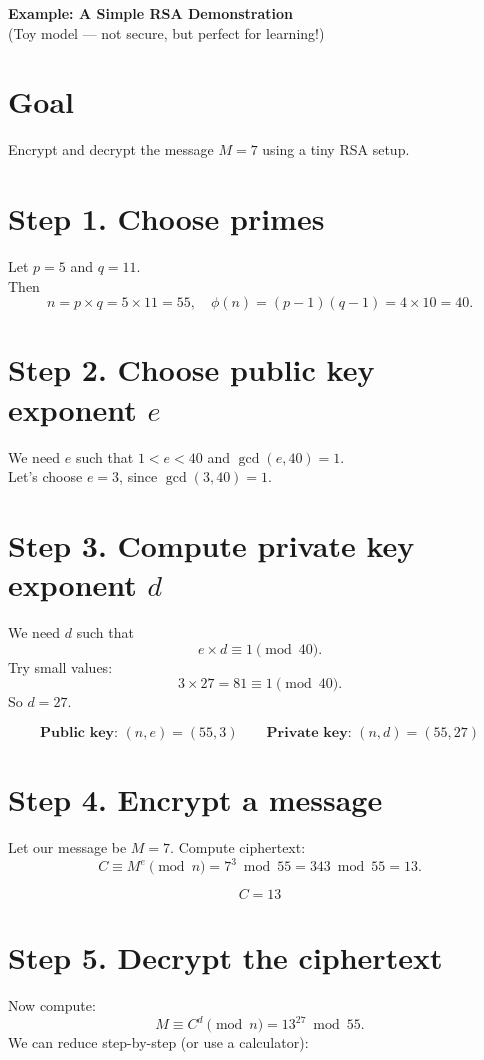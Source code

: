 \documentclass[12pt]{article}
\begin{document}
\begin{center}
    \Large \textbf{Example: A Simple RSA Demonstration}\\[1em]
    \normalsize (Toy model — not secure, but perfect for learning!)
\end{center}

\section*{Goal}
Encrypt and decrypt the message \( M = 7 \) using a tiny RSA setup.

\section*{Step 1. Choose primes}
Let \( p = 5 \) and \( q = 11 \).\\[0.5em]
Then
\[
n = p \times q = 5 \times 11 = 55,
\quad
\phi(n) = (p - 1)(q - 1) = 4 \times 10 = 40.
\]

\section*{Step 2. Choose public key exponent \( e \)}
We need \( e \) such that \( 1 < e < 40 \) and \( \gcd(e, 40) = 1 \).\\
Let’s choose \( e = 3 \), since \(\gcd(3,40) = 1\).

\section*{Step 3. Compute private key exponent \( d \)}
We need \( d \) such that
\[
e \times d \equiv 1 \pmod{40}.
\]
Try small values:
\[
3 \times 27 = 81 \equiv 1 \pmod{40}.
\]
So \( d = 27 \).

\[
\textbf{Public key: } (n, e) = (55, 3)
\quad\quad
\textbf{Private key: } (n, d) = (55, 27)
\]

\section*{Step 4. Encrypt a message}
Let our message be \( M = 7 \).  
Compute ciphertext:
\[
C \equiv M^e \pmod{n} = 7^3 \bmod 55 = 343 \bmod 55 = 13.
\]

\[
\boxed{C = 13}
\]

\section*{Step 5. Decrypt the ciphertext}
Now compute:
\[
M \equiv C^d \pmod{n} = 13^{27} \bmod 55.
\]
We can reduce step-by-step (or use a calculator):
\end{document}
